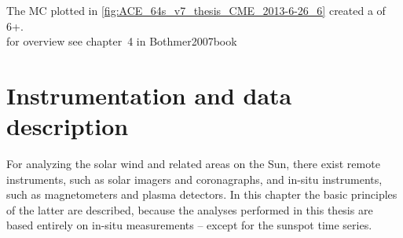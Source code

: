 The MC plotted in \autoref{fig:ACE_64s_v7_thesis_CME_2013-6-26_6} created a \Kp{} of 6+.\\

for overview see chapter~4 in Bothmer2007book\\




\chapter{Instrumentation and data description}
\label{chap:data}
For analyzing the solar wind and related areas on the Sun, there exist remote instruments, such as solar imagers and coronagraphs, and in-situ instruments, such as magnetometers and plasma detectors. In this chapter the basic principles of the latter are described, because the analyses performed in this thesis are based entirely on in-situ measurements -- except for the sunspot time series.

